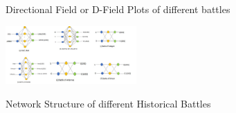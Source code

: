 \documentclass[]{article}
\begin{document}
\begin{figure}
\caption{Directional Field or D-Field Plots of different battles
} 
\end{figure}

\begin{figure}
\centering
\includegraphics[width=5cm]{DDPGAgent_network.jpg}\\
\caption{Network Structure of different Historical Battles}
\end{figure}
\newpage
\end{document}
